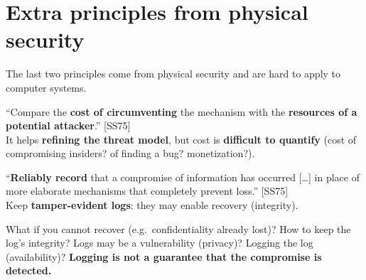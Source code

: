 \section{Extra principles from physical security}

\begin{warnbox}[title=Difficult to transpose to computer security!]
The last two principles come from physical security and are hard to apply to computer
systems.
\end{warnbox}

\begin{defnbox}[title=9 -- Work factor]
``Compare the \textbf{cost of circumventing} the mechanism with the \textbf{resources of
a potential attacker}.'' [SS75] \\
It helps \textbf{refining the threat model}, but cost is \textbf{difficult to
quantify} (cost of compromising insiders? of finding a bug? monetization?).
\end{defnbox}

\begin{defnbox}[title=10 -- Compromise recording]
``\textbf{Reliably record} that a compromise of information has occurred [\ldots] in
place of more elaborate mechanisms that completely prevent loss.'' [SS75] \\
Keep \textbf{tamper-evident logs}: they may enable recovery (integrity).
\end{defnbox}

\begin{warnbox}[title=Logs are not magic]
What if you cannot recover (e.g.\ confidentiality already lost)? How to keep the log's
integrity? Logs may be a vulnerability (privacy)? Logging the log (availability)?
\textbf{Logging is not a guarantee that the compromise is detected.}
\end{warnbox}


